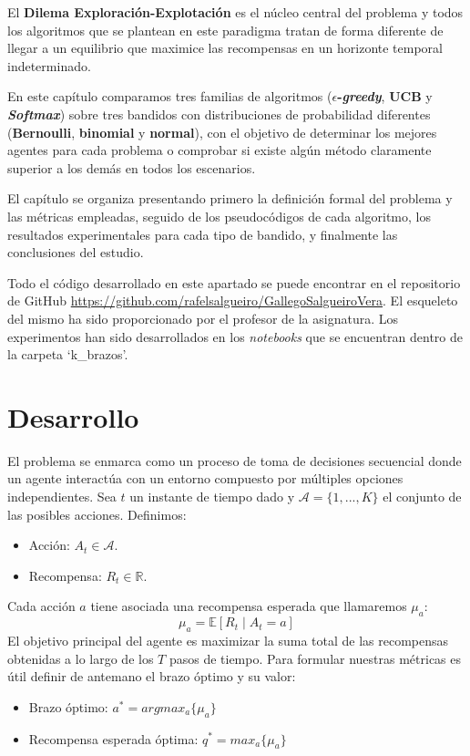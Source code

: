 El \textbf{Dilema Exploración-Explotación} es el núcleo central del problema y todos los algoritmos que se plantean en este paradigma tratan de forma diferente de llegar a un equilibrio que maximice
las recompensas en un horizonte temporal indeterminado.

En este capítulo comparamos tres familias de algoritmos (\textbf{$\epsilon$-\textit{greedy}}, \textbf{UCB} y \textbf{\textit{Softmax}}) sobre tres bandidos con distribuciones de
probabilidad diferentes (\textbf{Bernoulli}, \textbf{binomial} y \textbf{normal}), con el objetivo de determinar los mejores agentes para cada problema o 
comprobar si existe algún método claramente superior a los demás en todos los escenarios.

El capítulo se organiza presentando primero la definición formal del problema y las métricas empleadas, seguido de los pseudocódigos de cada algoritmo, los resultados experimentales para cada tipo de bandido, y finalmente las conclusiones del estudio.

Todo el código desarrollado en este apartado se puede encontrar en el repositorio de GitHub \href{https://github.com/rafelsalgueiro/GallegoSalgueiroVera}{https://github.com/rafelsalgueiro/GallegoSalgueiroVera}. El esqueleto del mismo ha sido proporcionado por el profesor de la asignatura. Los experimentos han sido desarrollados en los \textit{notebooks} que se encuentran dentro de la carpeta `k\_brazos'.

\section{Desarrollo}

El problema se enmarca como un proceso de toma de decisiones secuencial donde un agente interactúa con un entorno compuesto por múltiples opciones independientes. Sea $t$ un instante de tiempo dado y $\mathcal{A}=\{1,...,K\}$ el conjunto de las posibles acciones. Definimos: 

\begin{itemize}
    \item Acción: $A_t\in \mathcal{A}$.
    \item Recompensa: $R_t\in \mathbb{R}$.
\end{itemize}

Cada acción $a$ tiene asociada una recompensa esperada que llamaremos $\mu_a$:
$$\mu_a=\mathbb{E}[R_t \mid A_t=a]$$
El objetivo principal del agente es maximizar la suma total de las recompensas obtenidas a lo 
largo de los $T$ pasos de tiempo. Para formular nuestras métricas es útil definir de antemano el brazo
óptimo y su valor:
\begin{itemize}
    \item Brazo óptimo: $a^*=argmax_a\{\mu_a\}$
    \item Recompensa esperada óptima: $q^*=max_a\{\mu_a\}$
\end{itemize}

